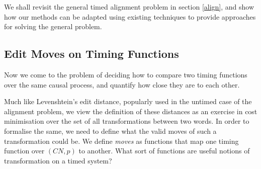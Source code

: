 \documentclass[conference]{IEEEtran}
\begin{document}
We shall revisit the general timed alignment problem in section \ref{align}, and show how our methods 
can be adapted using existing techniques to provide approaches for solving the general 
problem. 

\subsection{Edit Moves on Timing Functions}
Now we come to the problem of deciding how to compare two timing functions over the same causal process, and quantify how close they are to each other. 

Much like Levenshtein's edit distance, popularly used in the untimed case of the alignment problem, we view the definition of these distances as an exercise in cost minimisation over the set of all transformations between two words. 
In order to formalise the same, we need to define what the valid moves of such a transformation could be. 
We define \textit{moves} as functions that map one timing function over $(CN, p)$ to another. 
What sort of functions are useful notions of transformation on a timed system? 
\end{document}
